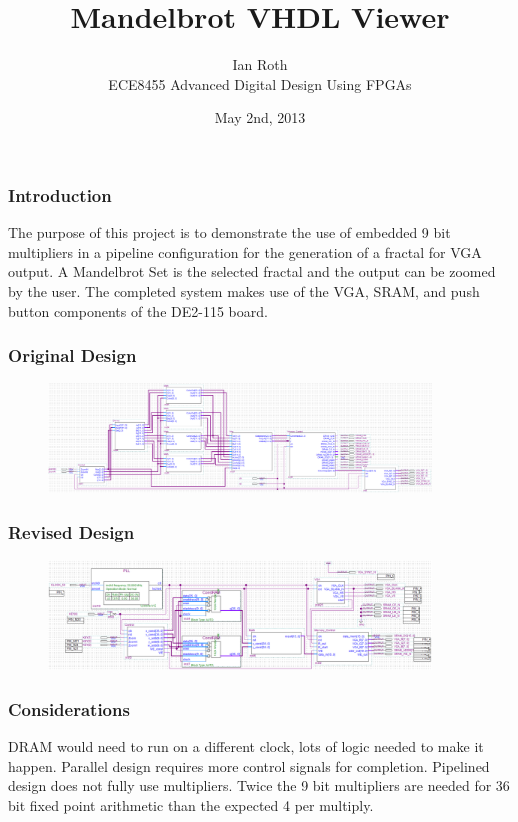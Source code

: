 \documentclass{beamer}
\title{Mandelbrot VHDL Viewer}
\author{Ian Roth \\
    ECE8455 Advanced Digital Design Using FPGAs}
\date{May 2nd, 2013}
\begin{document}
\begin{frame}
\titlepage
\end{frame}

\begin{frame}
\frametitle{Introduction}
The purpose of this project is to demonstrate the use of embedded 9 bit multipliers in a pipeline configuration for the generation of a fractal for VGA output. A Mandelbrot Set is the selected fractal and the output can be zoomed by the user. The completed system makes use of the VGA, SRAM, and push button components of the DE2-115 board.
\end{frame}

\begin{frame}
\frametitle{Original Design}
\begin{figure}[H]
\centering
\includegraphics[width=4in]{Diagram}
\end{figure}
\end{frame}

\begin{frame}
\frametitle{Revised Design}
\begin{figure}[H]
\centering
\includegraphics[width=4in]{FinalDiagram}
\end{figure}
\end{frame}

\begin{frame}
\frametitle{Considerations}
DRAM would need to run on a different clock, lots of logic needed to make it happen.
\pause
\linebreak
Parallel design requires more control signals for completion. Pipelined design does not fully use multipliers.
\pause
\linebreak
Twice the 9 bit multipliers are needed for 36 bit fixed point arithmetic than the expected 4 per multiply.
\end{frame}
\end{document}
